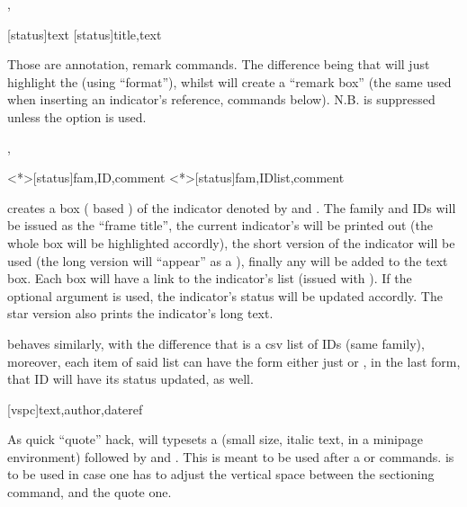 \documentclass[dctools,english,tocdepth=3,secdepth=3]{ufrgscca} %
\begin{document}
\begin{Macros}{\textmark, \comment}
	\begin{Syntax}%
	\Macro{\textmark}[status]{text}
	\Macro{\comment}[status]{title,text}
\end{Syntax}
Those are annotation, remark commands. The difference being that \Macro{\textmark}{} will just highlight the  (using  “format”), whilst  will create a “remark box” (the same used when inserting an indicator's reference, commands below). N.B. \Macro{\comment}{} is suppressed unless the option  is used.
\end{Macros}

\begin{Macros}{\indref,\indreflst}
	\begin{Syntax}%
	\Macro{\indref}<*>[status]{fam,ID,comment}
	\Macro{\indreflst}<*>[status]{fam,IDlist,comment}
\end{Syntax}
\Macro{\indref}{} creates a box ( based  ) of the indicator denoted by   and . The family and IDs will be issued as the “frame title”, the current indicator's  will be printed out (the whole box will be highlighted accordly), the short version of the indicator will be used (the long version will “appear” as a ), finally any  will be added to the text box. Each \Macro{\indref}{} box will have a link to the indicator's list (issued with \Macro{\PrintIndicators}{}). If the optional argument  is used, the indicator's status will be updated accordly. The star version also prints the indicator's long text.

\Macro{\indreflst}{} behaves similarly, with the difference that  is a csv list of IDs (same family), moreover, each item of said list can have the form either just  or , in the last form, that ID will have its status updated, as well.
\end{Macros}

\begin{Macros}{\fancyquote}
	\begin{Syntax}%
	\Macro{\fancyquote}[vspc]{text,author,dateref}
\end{Syntax}
As quick “quote” hack, \Macro{\fancyquote}{} will typesets a  (small size, italic  text, in a minipage environment) followed by  and . This is meant to be used after a \Macro{\chapter}{} or \Macro{\section}{} commands.  is to be used in case one has to adjust the vertical space between the sectioning command, and the quote one.
\end{Macros}
\end{document}
